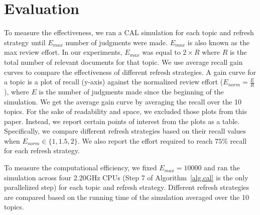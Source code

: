 \section{Evaluation}
To measure the effectiveness, we ran a CAL simulation for each topic and refresh
strategy until $E_{max}$ number of judgments were made. $E_{max}$ is also known
as the max review effort. In our experiments, $E_{max}$ was equal to $2\times R$ where
$R$ is the total number of relevant documents for that topic. We use average
recall gain curves to compare the effectiveness of different refresh strategies.
A gain curve for a topic is a plot of recall (y-axis) against the normalized
review effort ($E_{norm} = \frac{E}{R}$), where $E$ is the number of judgments made since
the beginning of the simulation. We get the average gain curve by averaging the
recall over the 10 topics. For the sake of readability and space, we excluded
those plots from this paper. Instead, we report certain points of interest from
the plots as a table. Specifically, we compare different refresh strategies based
on their recall values when $E_{norm} \in \{1,1.5,2\}$. We also report the
effort required to reach $75\%$ recall for each refresh strategy.

To measure the computational efficiency, we fixed $E_{max}=10000$ and ran the
simulation across four 2.20GHz CPUs (Step 7 of Algorithm~\ref{alg.cal} is the
only parallelized step) for each topic and refresh strategy. Different refresh
strategies are compared based on the running time of the simulation averaged
over the 10 topics.
